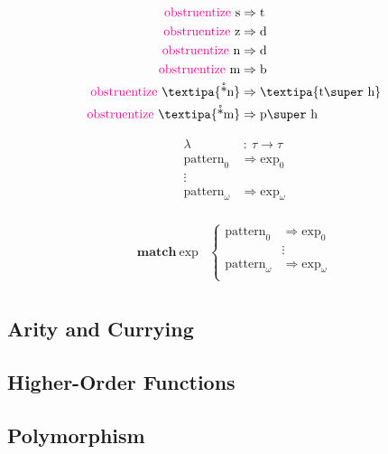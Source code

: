 \documentclass{report}[12pt]
\begin{document}
\begin{align*}
  \text{\textcolor{magenta}{obstruentize}}\ \text{s} & \Rightarrow \text{t} \\
  \text{\textcolor{magenta}{obstruentize}}\ \text{z} & \Rightarrow \text{d} \\
  \text{\textcolor{magenta}{obstruentize}}\ \text{n} & \Rightarrow \text{d} \\
  \text{\textcolor{magenta}{obstruentize}}\ \text{m} & \Rightarrow \text{b} \\
  \text{\textcolor{magenta}{obstruentize}}\ \text{\textipa{\r*n}} & \Rightarrow \text{\textipa{t\super h}} \\
  \text{\textcolor{magenta}{obstruentize}}\ \text{\textipa{\r*m}} & \Rightarrow \text{p\super h} \\
\end{align*}

\begin{align*}
  \lambda &\ :\ \tau \rightarrow \tau \\
  \text{pattern}_0 & \Rightarrow \text{exp}_0 \\
  \vdots & \\
  \text{pattern}_\omega & \Rightarrow \text{exp}_\omega \\
\end{align*}

\begin{align*}
  \textbf{match}\ \text{exp} & \begin{cases}
                                 \text{pattern}_0 & \Rightarrow \text{exp}_0 \\
                                                  & \vdots \\
                                 \text{pattern}_\omega & \Rightarrow \text{exp}_\omega \\
                               \end{cases}\\
\end{align*}

\subsection*{Arity and Currying}

\subsection*{Higher-Order Functions}

\subsection*{Polymorphism}
\end{document}
